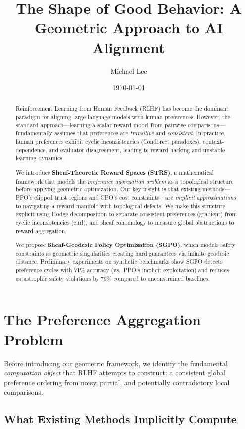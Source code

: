 \documentclass{article}
\title{The Shape of Good Behavior: A Geometric Approach to AI Alignment}
\author{Michael Lee}
\date{\today}
\begin{document}
\maketitle

\begin{abstract}
Reinforcement Learning from Human Feedback (RLHF) has become the dominant paradigm for aligning large language models with human preferences. However, the standard approach---learning a scalar reward model from pairwise comparisons---fundamentally assumes that preferences are \emph{transitive} and \emph{consistent}. In practice, human preferences exhibit cyclic inconsistencies (Condorcet paradoxes), context-dependence, and evaluator disagreement, leading to reward hacking and unstable learning dynamics.

We introduce \textbf{Sheaf-Theoretic Reward Spaces (STRS)}, a mathematical framework that models the \emph{preference aggregation problem} as a topological structure before applying geometric optimization. Our key insight is that existing methods---PPO's clipped trust regions and CPO's cost constraints---are \emph{implicit approximations} to navigating a reward manifold with topological defects. We make this structure explicit using Hodge decomposition to separate consistent preferences (gradient) from cyclic inconsistencies (curl), and sheaf cohomology to measure global obstructions to reward aggregation.

We propose \textbf{Sheaf-Geodesic Policy Optimization (SGPO)}, which models safety constraints as geometric singularities creating hard guarantees via infinite geodesic distance. Preliminary experiments on synthetic benchmarks show SGPO detects preference cycles with 71\% accuracy (vs.\ PPO's implicit exploitation) and reduces catastrophic safety violations by 79\% compared to unconstrained baselines.
\end{abstract}

\section{The Preference Aggregation Problem}

Before introducing our geometric framework, we identify the fundamental \emph{computation object} that RLHF attempts to construct: a consistent global preference ordering from noisy, partial, and potentially contradictory local comparisons.

\subsection{What Existing Methods Implicitly Compute}
\end{document}
